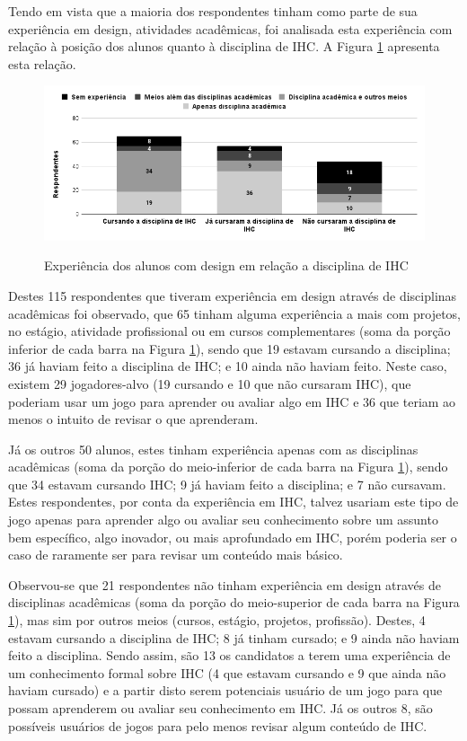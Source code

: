 Tendo em vista que a maioria dos respondentes tinham como parte de sua experiência em design, atividades acadêmicas, foi analisada esta experiência com relação à posição dos alunos quanto à disciplina de IHC. A Figura \ref{Fig:exp-design-disc.png} apresenta esta relação.


\begin{figure}[htbp]
	\centering
	\caption{Experiência dos alunos com design em relação a disciplina de IHC}
	\includegraphics[keepaspectratio=true,scale=0.545]{figuras/resultados/exp-design-disc.png}
	\label{Fig:exp-design-disc.png}
\end{figure}

Destes 115 respondentes que tiveram experiência em design através de disciplinas acadêmicas foi observado, que 65 tinham alguma experiência a mais com projetos, no estágio, atividade profissional ou em cursos complementares (soma da porção inferior de cada barra na Figura \ref{Fig:exp-design-disc.png}), sendo que 19 estavam cursando a disciplina; 36 já haviam feito a disciplina de IHC; e 10 ainda não haviam feito. Neste caso, existem 29 jogadores-alvo (19 cursando e 10 que não cursaram IHC), que poderiam usar um jogo para aprender ou avaliar algo em IHC e 36 que teriam ao menos o intuito de revisar o que aprenderam.

Já os outros 50 alunos, estes tinham experiência apenas com as disciplinas acadêmicas (soma da porção do meio-inferior de cada barra na Figura \ref{Fig:exp-design-disc.png}), sendo que 34 estavam cursando IHC; 9 já haviam feito a disciplina; e 7 não cursavam. Estes respondentes, por conta da experiência em IHC, talvez usariam este tipo de jogo apenas para aprender algo ou avaliar seu conhecimento sobre um assunto bem específico, algo inovador, ou mais aprofundado em IHC, porém poderia ser o caso de raramente ser para revisar um conteúdo mais básico. 

Observou-se que 21 respondentes não tinham experiência em design através de disciplinas acadêmicas (soma da porção do meio-superior de cada barra na Figura \ref{Fig:exp-design-disc.png}), mas sim por outros meios (cursos, estágio, projetos, profissão). Destes, 4 estavam cursando a disciplina de IHC; 8 já tinham cursado; e 9 ainda não haviam feito a disciplina. Sendo assim, são 13 os candidatos a terem uma experiência de um conhecimento formal sobre IHC (4 que estavam cursando e 9 que ainda não haviam cursado) e a partir disto serem potenciais usuário de um jogo para que possam aprenderem ou avaliar seu conhecimento em IHC. Já os outros 8, são possíveis usuários de jogos para pelo menos revisar algum conteúdo de IHC.

